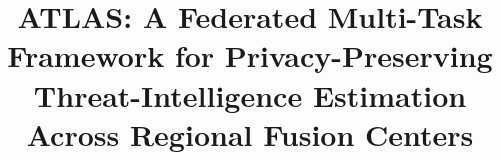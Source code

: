 \documentclass[conference]{IEEEtran}
\begin{document}
\title{ATLAS: A Federated Multi-Task Framework for Privacy-Preserving Threat-Intelligence Estimation Across Regional Fusion Centers}


\maketitle

\sloppy
\end{document}
